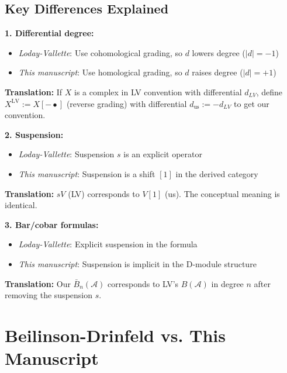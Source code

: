 \subsection{Key Differences Explained}

\textbf{1. Differential degree:}
\begin{itemize}
\item \textit{Loday-Vallette}: Use cohomological grading, so $d$ lowers degree ($|d| = -1$)
\item \textit{This manuscript}: Use homological grading, so $d$ raises degree ($|d| = +1$)
\end{itemize}

\textbf{Translation:} If $X$ is a complex in LV convention with differential $d_{LV}$, define $X^{\text{LV}} := X[-\bullet]$ (reverse grading) with differential $d_{\text{us}} := -d_{LV}$ to get our convention.

\textbf{2. Suspension:}
\begin{itemize}
\item \textit{Loday-Vallette}: Suspension $s$ is an explicit operator
\item \textit{This manuscript}: Suspension is a shift $[1]$ in the derived category
\end{itemize}

\textbf{Translation:} $sV$ (LV) corresponds to $V[1]$ (us). The conceptual meaning is identical.

\textbf{3. Bar/cobar formulas:}
\begin{itemize}
\item \textit{Loday-Vallette}: Explicit suspension in the formula
\item \textit{This manuscript}: Suspension is implicit in the D-module structure
\end{itemize}

\textbf{Translation:} Our $\bar{B}_n(\mathcal{A})$ corresponds to LV's $B(\mathcal{A})$ in degree $n$ after removing the suspension $s$.

\section{Beilinson-Drinfeld vs. This Manuscript}

